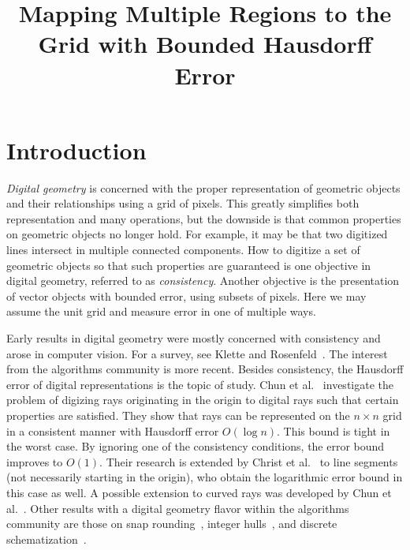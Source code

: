 \documentclass[a4paper,UKenglish,cleveref]{lipics-v2019}
\title{Mapping Multiple Regions to the Grid with Bounded Hausdorff Error}
\newcommand{\etal}{\textnormal{et al.}\xspace}
\begin{document}
\maketitle

\section{Introduction}

\emph{Digital geometry} is concerned with the proper representation of geometric objects and their relationships using a grid of pixels. This greatly
simplifies both representation and many operations, but the downside is that common properties on geometric objects no longer hold. For example, it may be that two digitized lines intersect in multiple connected components. How to digitize a set of geometric objects so that such properties are guaranteed is one objective in digital geometry, referred to as \emph{consistency}. Another objective is the presentation of vector objects with bounded error, using subsets of pixels. Here we may assume the unit grid and measure error in one of multiple ways.

Early results in digital geometry were mostly concerned with consistency and arose in computer vision. For a survey, see Klette and Rosenfeld~\cite{klette2004digitalgeometry,klette2004digital}.
The interest from the algorithms community is more recent. Besides consistency, the Hausdorff error of digital representations is the topic of study.
Chun \etal~\cite{chun2009consistent} investigate the problem of digizing rays originating in the origin to digital rays such that certain properties are satisfied. They show that rays can be represented on the $n\times n$ grid in a consistent manner with Hausdorff error $O(\log n)$. This bound is tight in the worst case. By ignoring one of the consistency conditions, the error bound improves to $O(1)$.
Their research is extended by Christ \etal~\cite{christ2012consistent} to line segments (not necessarily starting in the origin), who obtain
the logarithmic error bound in this case as well.
A possible extension to curved rays was developed by Chun \etal~\cite{chun2019consistent}.
Other results with a digital geometry flavor within the algorithms community are those on snap rounding~\cite{de2007intersection,guibas,hershberger}, integer hulls~\cite{Althaus04,Harvey99}, and discrete schematization~\cite{loffler2017discretized}.

\end{document}
